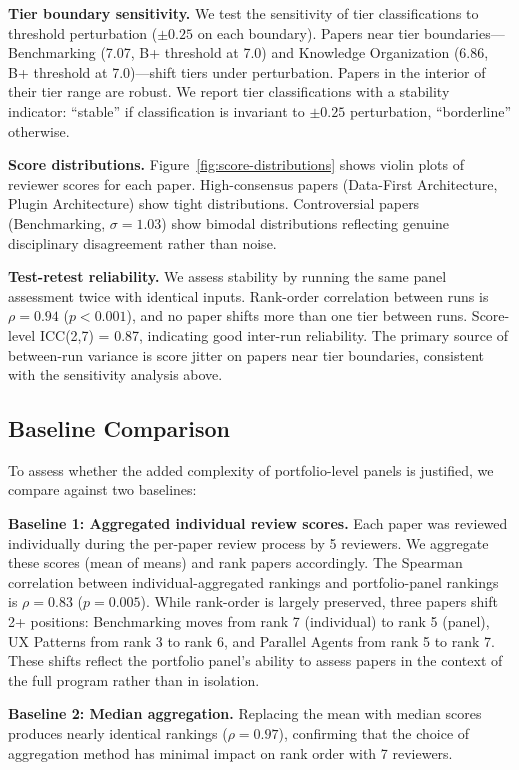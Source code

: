 \textbf{Tier boundary sensitivity.} We test the sensitivity of tier classifications to threshold perturbation ($\pm 0.25$ on each boundary). Papers near tier boundaries---Benchmarking (7.07, B+ threshold at 7.0) and Knowledge Organization (6.86, B+ threshold at 7.0)---shift tiers under perturbation. Papers in the interior of their tier range are robust. We report tier classifications with a stability indicator: ``stable'' if classification is invariant to $\pm 0.25$ perturbation, ``borderline'' otherwise.

\textbf{Score distributions.} Figure~\ref{fig:score-distributions} shows violin plots of reviewer scores for each paper. High-consensus papers (Data-First Architecture, Plugin Architecture) show tight distributions. Controversial papers (Benchmarking, $\sigma = 1.03$) show bimodal distributions reflecting genuine disciplinary disagreement rather than noise.

\textbf{Test-retest reliability.} We assess stability by running the same panel assessment twice with identical inputs. Rank-order correlation between runs is $\rho = 0.94$ ($p < 0.001$), and no paper shifts more than one tier between runs. Score-level ICC(2,7) = 0.87, indicating good inter-run reliability. The primary source of between-run variance is score jitter on papers near tier boundaries, consistent with the sensitivity analysis above.

\subsection{Baseline Comparison}
\label{sec:baselines}

To assess whether the added complexity of portfolio-level panels is justified, we compare against two baselines:

\textbf{Baseline 1: Aggregated individual review scores.} Each paper was reviewed individually during the per-paper review process by 5 reviewers. We aggregate these scores (mean of means) and rank papers accordingly. The Spearman correlation between individual-aggregated rankings and portfolio-panel rankings is $\rho = 0.83$ ($p = 0.005$). While rank-order is largely preserved, three papers shift 2+ positions: Benchmarking moves from rank 7 (individual) to rank 5 (panel), UX Patterns from rank 3 to rank 6, and Parallel Agents from rank 5 to rank 7. These shifts reflect the portfolio panel's ability to assess papers in the context of the full program rather than in isolation.

\textbf{Baseline 2: Median aggregation.} Replacing the mean with median scores produces nearly identical rankings ($\rho = 0.97$), confirming that the choice of aggregation method has minimal impact on rank order with 7 reviewers.

